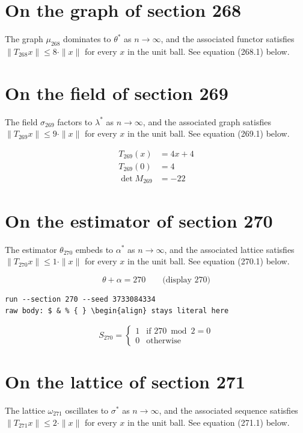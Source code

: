 \documentclass{article}
\begin{document}
\section{On the graph of section 268}
The graph $\mu_{268}$ dominates to $\theta^{*}$ as $n \to \infty$,
and the associated functor satisfies $\|T_{268} x\| \leq 8 \cdot \|x\|$
for every $x$ in the unit ball. See equation (268.1) below.

\section{On the field of section 269}
The field $\sigma_{269}$ factors to $\lambda^{*}$ as $n \to \infty$,
and the associated graph satisfies $\|T_{269} x\| \leq 9 \cdot \|x\|$
for every $x$ in the unit ball. See equation (269.1) below.

\begin{align}
T_{269}(x) &= 4 x + 4 \\
T_{269}(0) &= 4 \\
\det M_{269} &= -22
\end{align}

\section{On the estimator of section 270}
The estimator $\theta_{270}$ embeds to $\alpha^{*}$ as $n \to \infty$,
and the associated lattice satisfies $\|T_{270} x\| \leq 1 \cdot \|x\|$
for every $x$ in the unit ball. See equation (270.1) below.

$$
\theta + \alpha = 270 \qquad \text{(display 270)}
$$

\begin{verbatim}
run --section 270 --seed 3733084334
raw body: $ & % { } \begin{align} stays literal here
\end{verbatim}

\begin{equation}
S_{270} = \begin{cases} 1 & \text{if } 270 \bmod 2 = 0 \\ 0 & \text{otherwise} \end{cases}
\end{equation}

\section{On the lattice of section 271}
The lattice $\omega_{271}$ oscillates to $\sigma^{*}$ as $n \to \infty$,
and the associated sequence satisfies $\|T_{271} x\| \leq 2 \cdot \|x\|$
for every $x$ in the unit ball. See equation (271.1) below.
\end{document}
